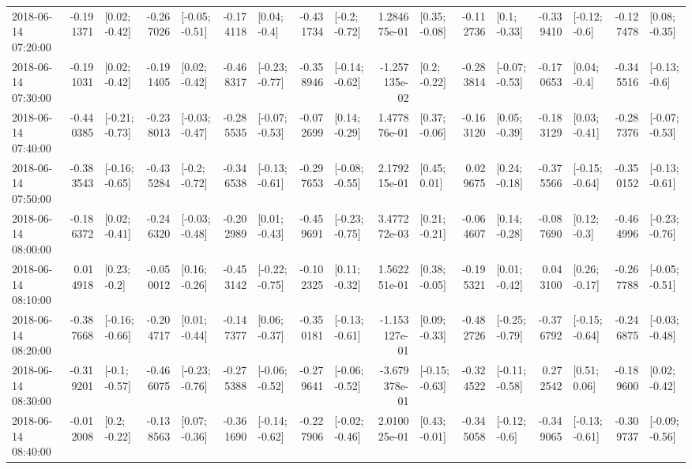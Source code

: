 \begin{tabular}{lrlrlrlrlrlrlrlrl}
2018-06-14 07:20:00 & -0.191371 &   [0.02; -0.42] & -0.267026 &  [-0.05; -0.51] & -0.174118 &    [0.04; -0.4] & -0.431734 &   [-0.2; -0.72] &  1.284675e-01 &   [0.35; -0.08] & -0.112736 &    [0.1; -0.33] & -0.339410 &   [-0.12; -0.6] & -0.127478 &   [0.08; -0.35] \\
2018-06-14 07:30:00 & -0.191031 &   [0.02; -0.42] & -0.191405 &   [0.02; -0.42] & -0.468317 &  [-0.23; -0.77] & -0.358946 &  [-0.14; -0.62] & -1.257135e-02 &    [0.2; -0.22] & -0.283814 &  [-0.07; -0.53] & -0.170653 &    [0.04; -0.4] & -0.345516 &   [-0.13; -0.6] \\
2018-06-14 07:40:00 & -0.440385 &  [-0.21; -0.73] & -0.238013 &  [-0.03; -0.47] & -0.285535 &  [-0.07; -0.53] & -0.072699 &   [0.14; -0.29] &  1.477876e-01 &   [0.37; -0.06] & -0.163120 &   [0.05; -0.39] & -0.183129 &   [0.03; -0.41] & -0.287376 &  [-0.07; -0.53] \\
2018-06-14 07:50:00 & -0.383543 &  [-0.16; -0.65] & -0.435284 &   [-0.2; -0.72] & -0.346538 &  [-0.13; -0.61] & -0.297653 &  [-0.08; -0.55] &  2.179215e-01 &    [0.45; 0.01] &  0.029675 &   [0.24; -0.18] & -0.375566 &  [-0.15; -0.64] & -0.350152 &  [-0.13; -0.61] \\
2018-06-14 08:00:00 & -0.186372 &   [0.02; -0.41] & -0.246320 &  [-0.03; -0.48] & -0.202989 &   [0.01; -0.43] & -0.459691 &  [-0.23; -0.75] &  3.477272e-03 &   [0.21; -0.21] & -0.064607 &   [0.14; -0.28] & -0.087690 &    [0.12; -0.3] & -0.464996 &  [-0.23; -0.76] \\
2018-06-14 08:10:00 &  0.014918 &    [0.23; -0.2] & -0.050012 &   [0.16; -0.26] & -0.453142 &  [-0.22; -0.75] & -0.102325 &   [0.11; -0.32] &  1.562251e-01 &   [0.38; -0.05] & -0.195321 &   [0.01; -0.42] &  0.043100 &   [0.26; -0.17] & -0.267788 &  [-0.05; -0.51] \\
2018-06-14 08:20:00 & -0.387668 &  [-0.16; -0.66] & -0.204717 &   [0.01; -0.44] & -0.147377 &   [0.06; -0.37] & -0.350181 &  [-0.13; -0.61] & -1.153127e-01 &   [0.09; -0.33] & -0.482726 &  [-0.25; -0.79] & -0.376792 &  [-0.15; -0.64] & -0.246875 &  [-0.03; -0.48] \\
2018-06-14 08:30:00 & -0.319201 &   [-0.1; -0.57] & -0.466075 &  [-0.23; -0.76] & -0.275388 &  [-0.06; -0.52] & -0.279641 &  [-0.06; -0.52] & -3.679378e-01 &  [-0.15; -0.63] & -0.324522 &  [-0.11; -0.58] &  0.272542 &    [0.51; 0.06] & -0.189600 &   [0.02; -0.42] \\
2018-06-14 08:40:00 & -0.012008 &    [0.2; -0.22] & -0.138563 &   [0.07; -0.36] & -0.361690 &  [-0.14; -0.62] & -0.227906 &  [-0.02; -0.46] &  2.010025e-01 &   [0.43; -0.01] & -0.345058 &   [-0.12; -0.6] & -0.349065 &  [-0.13; -0.61] & -0.309737 &  [-0.09; -0.56] \\

\end{tabular}
